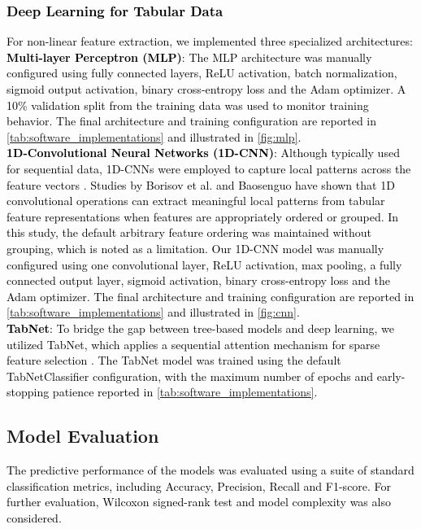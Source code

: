\documentclass[a4paper,fleqn]{cas-sc}
\begin{document}
\subsubsection{\textcolor{black}{Deep Learning for Tabular Data}}
\textcolor{black}{For non-linear feature extraction, we implemented three specialized architectures:\\
\textbf{Multi-layer Perceptron (MLP)}: The MLP architecture was manually configured using fully connected layers, ReLU activation, batch normalization, sigmoid output activation, binary cross-entropy loss and the Adam optimizer. A 10\% validation split from the training data was used to monitor training behavior. The final architecture and training configuration are reported in \cref{tab:software_implementations} and illustrated in \cref{fig:mlp}.\\
\textbf{1D-Convolutional Neural Networks (1D-CNN)}: Although typically used for sequential data, 1D-CNNs were employed to capture local patterns across the feature vectors \cite{yin2017survey}. Studies by Borisov et al. \cite{borisov2022} and Baosenguo \cite{baosenguo2021} have shown that 1D convolutional operations can extract meaningful local patterns from tabular feature representations when features are appropriately ordered or grouped. \textcolor{black}{In this study, the default arbitrary feature ordering was maintained without grouping, which is noted as a limitation. Our 1D-CNN model was manually configured using one convolutional layer, ReLU activation, max pooling, a fully connected output layer, sigmoid activation, binary cross-entropy loss and the Adam optimizer. The final architecture and training configuration are reported in \cref{tab:software_implementations} and illustrated in \cref{fig:cnn}.}\\
\textbf{TabNet}: To bridge the gap between tree-based models and deep learning, we utilized TabNet, which applies a sequential attention mechanism for sparse feature selection \cite{arik2020tabnet}. The TabNet model was trained using the default TabNetClassifier configuration, with the maximum number of epochs and early-stopping patience reported in \cref{tab:software_implementations}.}


\subsection{Model Evaluation}
\textcolor{black}{The predictive performance of the models was evaluated using a suite of standard classification metrics, including Accuracy, Precision, Recall and F1-score. For further evaluation, Wilcoxon signed-rank test \cite{wilcoxon1945} and model complexity was also considered.} 
\end{document}
